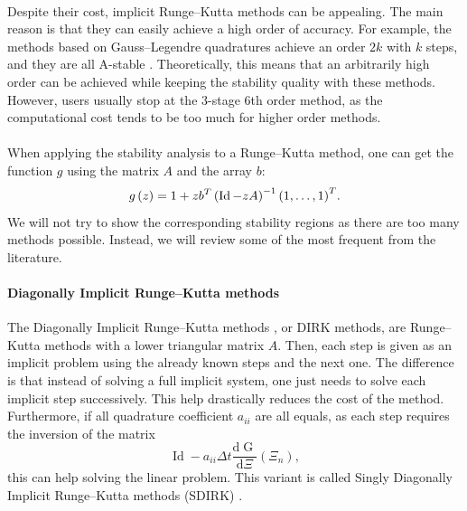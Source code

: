         \paragraph{}
        Despite their cost, implicit Runge--Kutta methods can be appealing.
        The main reason is that they can easily achieve a high order of accuracy.
        For example, the methods based on Gauss--Legendre quadratures achieve an order $2k$ with $k$ steps, and they are all A-stable \cite{Iserles2008}.
        Theoretically, this means that an arbitrarily high order can be achieved while keeping the stability quality with these methods.
        However, users usually stop at the 3-stage 6th order method, as the computational cost tends to be too much for higher order methods.

        \paragraph{}
        When applying the stability analysis to a Runge--Kutta method, one can get the function $g$ using the matrix $A$ and the array $b$:
        \begin{equation}
          g\left(z\right) = 1 + z {b}^T \left(\operatorname{Id} - zA\right)^{-1} {\left(1, \dots, 1\right)}^T .
        \end{equation}
        We will not try to show the corresponding stability regions as there are too many methods possible.
        Instead, we will review some of the most frequent from the literature.

        \paragraph{Diagonally Implicit Runge--Kutta methods}
        The Diagonally Implicit Runge--Kutta methods \cite{Alexander1977}, or DIRK methods, are Runge--Kutta methods with a lower triangular matrix $A$.
        Then, each step is given as an implicit problem using the already known steps and the next one.
        The difference is that instead of solving a full implicit system, one just needs to solve each implicit step successively.
        This help drastically reduces the cost of the method.
        Furthermore, if all quadrature coefficient $a_{ii}$ are all equals, as each step requires the inversion of the matrix
        \begin{equation}
          \operatorname{Id} - a_{ii} \Delta t \frac{\mathrm{d} \operatorname{G}}{\mathrm{d} \Xi}\left(\Xi_n\right) ,
        \end{equation}
        this can help solving the linear problem.
        This variant is called Singly Diagonally Implicit Runge--Kutta methods (SDIRK) \cite{HairerWanner1996}.

